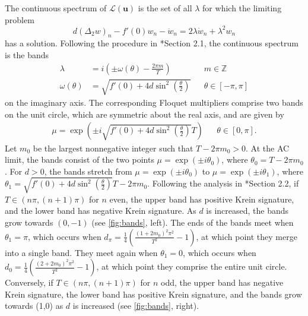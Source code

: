 \documentclass[12pt,reqno]{amsart}
\def\Z{{\mathbb Z}}
\def\calL{\mathcal{L}}
\newcommand{\uvec}{\mathbf{u}}
\theoremstyle{definition}
\begin{document}
The continuous spectrum of $\calL(\uvec)$ is the set of all $\lambda$ for which the limiting problem 
\begin{equation}\label{eq:DKGeigcont}
d (\Delta_2 w)_n - f'(0)w_n - \ddot{w}_n = 2 \lambda \dot{w}_n + \lambda^2 w_n
\end{equation}
has a solution. Following the procedure in \cite{cuevas-maraver2016}*{Section 2.1}, the continuous spectrum is the bands
\begin{equation}\label{eq:contspec}
\begin{aligned}
\lambda &= i\left( \pm \omega(\theta) - \frac{2 \pi m}{T} \right) && m \in \Z \\
\omega(\theta) &= \sqrt{ f'(0) + 4 d \sin^2\left( \frac{\theta}{2} \right) } && \theta \in [-\pi, \pi]
\end{aligned}
\end{equation}
on the imaginary axis. The corresponding Floquet multipliers comprise two bands on the unit circle,  which are symmetric about the real axis, and are given by
\begin{equation}\label{eq:contspecmult}
\begin{aligned}
\mu = \exp \left( \pm i \sqrt{f'(0) + 4 d \sin^2 \left(\frac{\theta}{2}\right) }T \right)  && \theta \in [0, \pi].
\end{aligned}
\end{equation}
Let $m_0$ be the largest nonnegative integer such that $T - 2 \pi m_0 > 0$. At the AC limit, the bands consist of the two points $\mu = \exp(\pm i \theta_0)$, where $\theta_0 =  T - 2 \pi m_0$. For $d>0$, the bands stretch from $\mu = \exp(\pm i \theta_0)$ to $\mu = \exp(\pm i \theta_1)$, where $\theta_1 = \sqrt{f'(0) + 4 d \sin^2 \left(\frac{\theta}{2}\right) }T - 2 \pi m_0$. Following the analysis in \cite{cuevas-maraver2016}*{Section 2.2}, if $T \in (n \pi, (n+1)\pi)$ for $n$ even, the upper band has positive Krein signature, and the lower band has negative Krein signature. As $d$ is increased, the bands grow towards $(0,-1)$ (see \cref{fig:bands}, left). The ends of the bands meet when $\theta_1 = \pi$, which occurs when $d_{\pi} = \frac{1}{4} \left( \frac{(1 + 2 m_0)^2 \pi^2}{T^2} - 1\right)$, at which point they merge into a single band. They meet again when $\theta_1 = 0$, which occurs when $d_0 = \frac{1}{4} \left( \frac{(2 + 2 m_0)^2 \pi^2}{T^2} - 1\right)$, at which point they comprise the entire unit circle.
Conversely, if $T \in (n \pi, (n+1)\pi)$ for $n$ odd, the upper band has negative Krein signature, the lower band has positive Krein signature, and the bands grow towards (1,0) as $d$ is increased (see \cref{fig:bands}, right).
\end{document}
